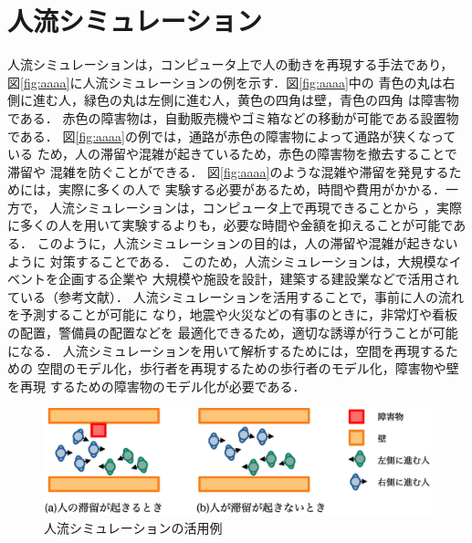 \chapter{人流シミュレーション}
\label{sec:background}
人流シミュレーションは，コンピュータ上で人の動きを再現する手法であり，
図\ref{fig:aaaa}に人流シミュレーションの例を示す．図\ref{fig:aaaa}中の
青色の丸は右側に進む人，緑色の丸は左側に進む人，黄色の四角は壁，青色の四角
は障害物である．
赤色の障害物は，自動販売機やゴミ箱などの移動が可能である設置物である．
図\ref{fig:aaaa}の例では，通路が赤色の障害物によって通路が狭くなっている
ため，人の滞留や混雑が起きているため，赤色の障害物を撤去することで滞留や
混雑を防ぐことができる．
図\ref{fig:aaaa}のような混雑や滞留を発見するためには，実際に多くの人で
実験する必要があるため，時間や費用がかかる．一方で，
人流シミュレーションは，コンピュータ上で再現できることから
，実際に多くの人を用いて実験するよりも，必要な時間や金額を抑えることが可能である．
このように，人流シミュレーションの目的は，人の滞留や混雑が起きないように
対策することである．
このため，人流シミュレーションは，大規模なイベントを企画する企業や
大規模や施設を設計，建築する建設業などで活用されている（参考文献）．
人流シミュレーションを活用することで，事前に人の流れを予測することが可能に
なり，地震や火災などの有事のときに，非常灯や看板の配置，警備員の配置などを
最適化できるため，適切な誘導が行うことが可能になる．
人流シミュレーションを用いて解析するためには，空間を再現するための
空間のモデル化，歩行者を再現するための歩行者のモデル化，障害物や壁を再現
するための障害物のモデル化が必要である．

\begin{figure}[h]
    \begin{center}
     \includegraphics[width=14cm,clip]{figure/jinryu_image2_r2.eps}
     \caption{人流シミュレーションの活用例}
     \label{fig:jinryu_image2}
    \end{center}
   \end{figure}


